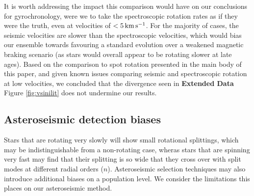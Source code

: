 \documentclass[12pt]{article}
\begin{document}
It is worth addressing the impact this comparison would have on our conclusions for gyrochronology, were we to take the spectroscopic rotation rates as if they were the truth, even at velocities of $< 5\, \rm{km\,s^{-1}}$. For the majority of cases, the seismic velocities are slower than the spectroscopic velocities, which would bias our ensemble towards favouring a standard evolution over a weakened magnetic braking scenario (as stars would overall appear to be rotating slower at late ages). Based on the comparison to spot rotation presented in the main body of this paper, and given known issues comparing seismic and spectroscopic rotation at low velocities, we concluded that the divergence seen in  \textbf{Extended Data} Figure \ref{fig:vsinilit} does not undermine our results.

\subsection{Asteroseismic detection biases}

Stars that are rotating very slowly will show small rotational splittings, which may be indistinguishable from a non-rotating case, wheras stars that are spinning very fast may find that their splitting is so wide that they cross over with split modes at different radial orders ($n$). Asteroseismic selection techniques may also introduce additional biases on a population level. We consider the limitations this places on our asteroseismic method.
\end{document}
